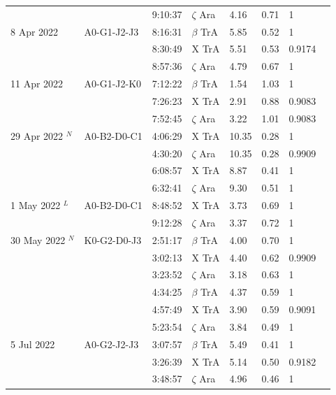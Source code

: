\documentclass[11pt]{article}
\begin{document}
\begin{table}[htbp]
{\begin{tabular}{l*{7}l}
            &             & 9:10:37 & $\zeta$ Ara    & 4.16  & 0.71 & 1 \\
8 Apr 2022  & A0-G1-J2-J3 & 8:16:31 & $\beta$ TrA    & 5.85  & 0.52 & 1 \\
            &             & 8:30:49 & X TrA          & 5.51  & 0.53 & 0.9174 \\
            &             & 8:57:36 & $\zeta$ Ara    & 4.79  & 0.67 & 1 \\
11 Apr 2022 & A0-G1-J2-K0 & 7:12:22 & $\beta$ TrA    & 1.54  & 1.03 & 1 \\
            &             & 7:26:23 & X TrA          & 2.91  & 0.88 & 0.9083 \\
            &             & 7:52:45 & $\zeta$ Ara    & 3.22  & 1.01 & 0.9083 \\
29 Apr 2022 $^N$ & A0-B2-D0-C1 & 4:06:29 & X TrA     & 10.35 & 0.28 & 1 \\
            &             & 4:30:20 & $\zeta$ Ara    & 10.35 & 0.28 & 0.9909 \\
            &             & 6:08:57 & X TrA          & 8.87  & 0.41 & 1 \\
            &             & 6:32:41 & $\zeta$ Ara    & 9.30  & 0.51 & 1 \\
1 May 2022 $^L$ & A0-B2-D0-C1 & 8:48:52 & X TrA      & 3.73  & 0.69 & 1 \\
            &             & 9:12:28 & $\zeta$ Ara    & 3.37  & 0.72 & 1  \\
30 May 2022 $^N$ & K0-G2-D0-J3 & 2:51:17 & $\beta$ TrA & 4.00  & 0.70 & 1 \\
            &             & 3:02:13 & X TrA          & 4.40  & 0.62 & 0.9909 \\
            &             & 3:23:52 & $\zeta$ Ara    & 3.18  & 0.63 & 1 \\
            &             & 4:34:25 & $\beta$ TrA    & 4.37  & 0.59 & 1 \\
            &             & 4:57:49 & X TrA          & 3.90  & 0.59 & 0.9091 \\
            &             & 5:23:54 & $\zeta$ Ara    & 3.84  & 0.49 & 1 \\
5 Jul 2022  & A0-G2-J2-J3 & 3:07:57 & $\beta$ TrA    & 5.49  & 0.41 & 1 \\
            &             & 3:26:39 & X TrA          & 5.14  & 0.50 & 0.9182 \\
            &             & 3:48:57 & $\zeta$ Ara    & 4.96  & 0.46 & 1 \\ 
\hline
\end{tabular}
}
\end{table}
\end{document}
